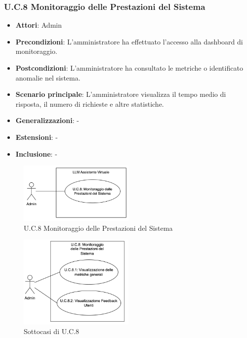 \subsubsection{U.C.8 Monitoraggio delle Prestazioni del Sistema}
\begin{itemize}
    \item \textbf{Attori}: Admin
    \item \textbf{Precondizioni}: L’amministratore ha effettuato l’accesso alla dashboard di monitoraggio.
    \item \textbf{Postcondizioni}: L’amministratore ha consultato le metriche o identificato anomalie nel sistema.
    \item \textbf{Scenario principale}: L’amministratore visualizza il tempo medio di risposta, il numero di richieste e altre statistiche.
    \item \textbf{Generalizzazioni}: -
    \item \textbf{Estensioni}: -
    \item \textbf{Inclusione}: -
\end{itemize}
\begin{figure}[H]
    \centering
    \includegraphics[width=0.5\textwidth]{img/UC8.png}
    \caption{U.C.8 Monitoraggio delle Prestazioni del Sistema}
\end{figure}
\begin{figure}[H]
    \centering
    \includegraphics[width=0.5\textwidth]{img/UC8p1.png}
    \caption{Sottocasi di U.C.8}
\end{figure}
